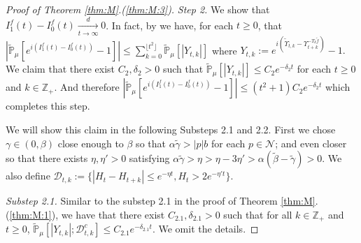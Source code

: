 \documentclass[12pt,a4paper]{amsart}
\theoremstyle{plain}
\theoremstyle{definition}
\numberwithin{equation}{section}
\begin{document}
\begin{proof}[Proof of Theorem \ref{thm:M}.(\ref{thm:M:3})]
\emph{Step 2.} We show that $I^f_1(t) - I^f_0(t) \xrightarrow[t\to \infty]{d} 0$.
    In fact, by \cite[Lemma 3.4.3]{Durrett2010Probability} we have, for each $t\geq 0$, that
 $|\widetilde {\mathbb P}_{\mu}[e^{i(I_{1}^{f}(t) - I_0^f(t))} - 1]| \leq \sum_{k=0}^{\lfloor t^2 \rfloor} \widetilde {\mathbb {P}}_\mu[|Y_{t,k}|]$ where $Y_{t,k} := e^{i(\widetilde {\Upsilon}_{t,k} - \Upsilon_{t+k}^{-T_{k}\widetilde {f}})} - 1. $
We claim that there exist $C_2, \delta_2>0$ such that $\widetilde {\mathbb {P}}_\mu[|Y_{t,k}|] \leq C_2e^{-\delta_2 t}$ for each $t\geq 0$ and $k \in \mathbb Z_+$.
And therefore $|\widetilde {\mathbb P}_{\mu}[e^{i(I_{1}^{f}(t) - I_0^f(t))} - 1]| \leq (t^2+1)C_2e^{-\delta_2 t}$
which completes this step.

 We will show this claim in the following Substeps 2.1 and 2.2.
First we chose $\gamma\in(0, \beta)$ close enough to $\beta$
so that $\alpha \tilde \gamma > |p|b$ for each $p\in \mathcal N$; and even closer so that there exists $\eta,\eta'>0$ satisfying $\alpha \tilde \gamma > \eta>\eta - 3\eta'> \alpha (\tilde \beta - \tilde \gamma)>0$. We also define $\mathcal{D}_{t,k} :=\{|H_t-H_{t+k}|\leq  e^{-\eta t}, H_{t}> 2e^{-\eta' t}\}$.


\emph{Substep 2.1.} Similar to the substep 2.1 in the proof of Theorem \ref{thm:M}.(\ref{thm:M:1}), we have that there exist $C_{2.1},\delta_{2.1} >0$ such that for all $k \in \mathbb Z_+$ and $t\geq 0$,
\(
\mathbb{\widetilde{P}}_{\mu}[|Y_{t,k}|;\mathcal{D}^c_{t,k}]
\leq C_{2.1} e^{-\delta_{2.1} t}.
\)
We omit the details.


\end{proof}
\end{document}
